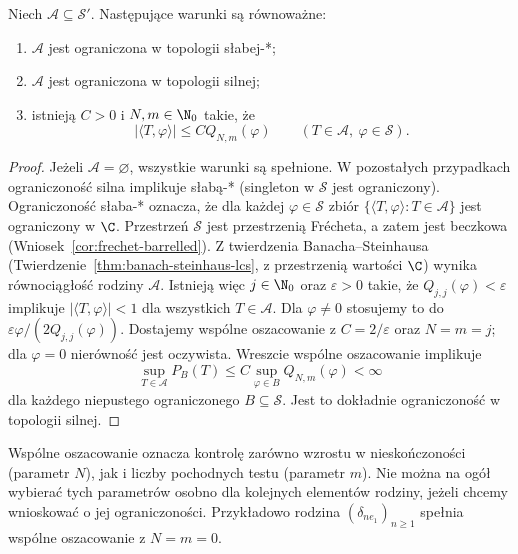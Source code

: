 \begin{twierdzenie}
\label{thm:dt-tempered-bounded-families}
Niech $\mathcal A\subseteq\mathcal S'$. Następujące warunki
są równoważne:
\begin{enumerate}
\item $\mathcal A$ jest ograniczona w topologii słabej-*;
\item $\mathcal A$ jest ograniczona w topologii silnej;
\item istnieją $C>0$ i $N,m\in\N_0$ takie, że
\[
 |\langle T,\varphi\rangle|\le C Q_{N,m}(\varphi)
 \qquad(T\in\mathcal A,\ \varphi\in\mathcal S).
\]
\end{enumerate}
\end{twierdzenie}
\begin{proof}
Jeżeli $\mathcal A=\varnothing$, wszystkie warunki są
spełnione. W pozostałych przypadkach ograniczoność silna
implikuje słabą-* (singleton w $\mathcal S$ jest ograniczony).
Ograniczoność słaba-* oznacza, że dla każdej $\varphi\in\mathcal S$
zbiór $\{\langle T,\varphi\rangle:T\in\mathcal A\}$ jest
ograniczony w $\C$. Przestrzeń $\mathcal S$ jest przestrzenią
Frécheta, a zatem jest beczkowa
(Wniosek~\ref{cor:frechet-barrelled}).
Z twierdzenia Banacha--Steinhausa
(Twierdzenie~\ref{thm:banach-steinhaus-lcs}, z przestrzenią
wartości $\C$) wynika równociągłość rodziny $\mathcal A$. Istnieją więc
$j\in\N_0$ oraz $\varepsilon>0$ takie, że
$Q_{j,j}(\varphi)<\varepsilon$ implikuje
$|\langle T,\varphi\rangle|<1$ dla wszystkich $T\in\mathcal A$.
Dla $\varphi\ne0$ stosujemy to do
$\varepsilon\varphi/(2Q_{j,j}(\varphi))$.
Dostajemy wspólne oszacowanie z $C=2/\varepsilon$
oraz $N=m=j$; dla $\varphi=0$ nierówność jest oczywista.
Wreszcie wspólne oszacowanie implikuje
\[
 \sup_{T\in\mathcal A}P_B(T)
 \le C\sup_{\varphi\in B}Q_{N,m}(\varphi)<\infty
\]
dla każdego niepustego ograniczonego $B\subseteq\mathcal S$.
Jest to dokładnie ograniczoność w topologii silnej.
\end{proof}

\begin{uwaga}
Wspólne oszacowanie oznacza kontrolę zarówno wzrostu
w nieskończoności (parametr $N$), jak i liczby pochodnych
testu (parametr $m$). Nie można na ogół wybierać tych
parametrów osobno dla kolejnych elementów rodziny, jeżeli
chcemy wnioskować o jej ograniczoności. Przykładowo
rodzina $(\delta_{ne_1})_{n\ge1}$ spełnia wspólne
oszacowanie z $N=m=0$.
\end{uwaga}

